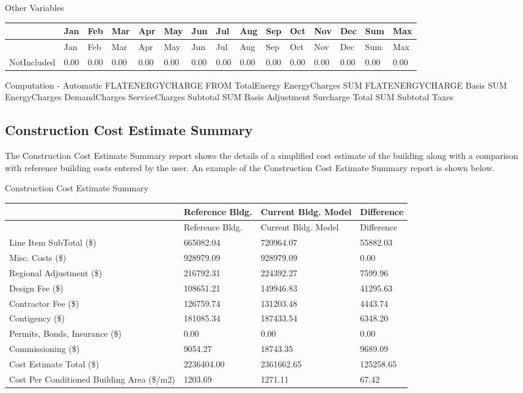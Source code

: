 Other Variables

{\scriptsize
\begin{longtable}[c]{>{\raggedright}p{0.4in}>{\raggedright}p{0.4in}>{\raggedright}p{0.4in}>{\raggedright}p{0.4in}>{\raggedright}p{0.4in}>{\raggedright}p{0.4in}>{\raggedright}p{0.4in}>{\raggedright}p{0.4in}>{\raggedright}p{0.4in}>{\raggedright}p{0.4in}>{\raggedright}p{0.4in}>{\raggedright}p{0.4in}>{\raggedright}p{0.4in}>{\raggedright}p{0.4in}>{\raggedright}p{0.4in}}
\toprule
~ & Jan & Feb & Mar & Apr & May & Jun & Jul & Aug & Sep & Oct & Nov & Dec & Sum & Max \tabularnewline
\midrule
\endfirsthead

\toprule
~ & Jan & Feb & Mar & Apr & May & Jun & Jul & Aug & Sep & Oct & Nov & Dec & Sum & Max \tabularnewline
\midrule
\endhead

NotIncluded & 0.00 & 0.00 & 0.00 & 0.00 & 0.00 & 0.00 & 0.00 & 0.00 & 0.00 & 0.00 & 0.00 & 0.00 & 0.00 & 0.00 \tabularnewline
\bottomrule
\end{longtable}}

Computation - Automatic FLATENERGYCHARGE FROM TotalEnergy EnergyCharges SUM FLATENERGYCHARGE Basis SUM EnergyCharges DemandCharges ServiceCharges Subtotal SUM Basis Adjustment Surcharge Total SUM Subtotal Taxes

\subsection{Construction Cost Estimate Summary}\label{construction-cost-estimate-summary}

The Construction Cost Estimate Summary report shows the details of a simplified cost estimate of the building along with a comparison with reference building costs entered by the user. An example of the Construction Cost Estimate Summary report is shown below.

Construction Cost Estimate Summary

\begin{longtable}[c]{>{\raggedright}p{1.5in}>{\raggedright}p{1.5in}>{\raggedright}p{1.5in}>{\raggedright}p{1.5in}}
\toprule
~ & Reference Bldg. & Current Bldg. Model & Difference \tabularnewline
\midrule
\endfirsthead

\toprule
~ & Reference Bldg. & Current Bldg. Model & Difference \tabularnewline
\midrule
\endhead

Line Item SubTotal (\$) & 665082.04 & 720964.07 & 55882.03 \tabularnewline
Misc. Costs (\$) & 928979.09 & 928979.09 & 0.00 \tabularnewline
Regional Adjustment (\$) & 216792.31 & 224392.27 & 7599.96 \tabularnewline
Design Fee (\$) & 108651.21 & 149946.83 & 41295.63 \tabularnewline
Contractor Fee (\$) & 126759.74 & 131203.48 & 4443.74 \tabularnewline
Contigency (\$) & 181085.34 & 187433.54 & 6348.20 \tabularnewline
Permits, Bonds, Insurance (\$) & 0.00 & 0.00 & 0.00 \tabularnewline
Commissioning (\$) & 9054.27 & 18743.35 & 9689.09 \tabularnewline
Cost Estimate Total (\$) & 2236404.00 & 2361662.65 & 125258.65 \tabularnewline
Cost Per Conditioned Building Area (\$/m2) & 1203.69 & 1271.11 & 67.42 \tabularnewline
\bottomrule
\end{longtable}

